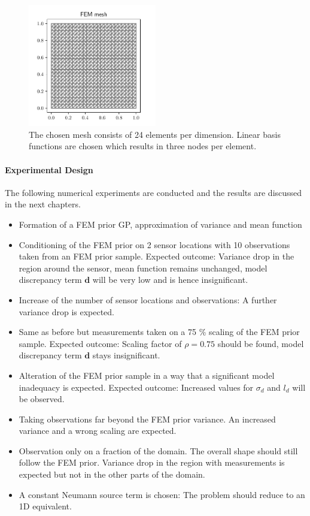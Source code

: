 \documentclass[%
  a4paper,oneside,%
  11pt,%
  smallchapters,
  style=printdev,
  extramargin,
  green,%
  rgb, <cmyk>
  ]{tubsbook}
\begin{document}
\begin{figure}[!ht]
\includegraphics[width=0.5\textwidth]{pics/mesh.pdf}
\centering
\caption[Mesh of the 2D example]{The chosen mesh consists of 24 elements per dimension. Linear basis functions are chosen which results in three nodes per element.}
\label{fig:meshFEM}
\end{figure}


\paragraph{Experimental Design}
The following numerical experiments are conducted and the results are discussed in the next chapters.

\begin{itemize}
  \item Formation of a FEM prior GP, approximation of variance and mean function
  \item Conditioning of the FEM prior on 2 sensor locations with 10 observations taken from an FEM prior sample. Expected outcome: Variance drop in the region around the sensor, mean function remains unchanged, model discrepancy term $\bm{d}$ will be very low and is hence insignificant.
  \item Increase of the number of sensor locations and observations: A further variance drop is expected.
  \item Same as before but measurements taken on a 75 \% scaling of the FEM prior sample. Expected outcome: Scaling factor of $\rho = 0.75$ should be found, model discrepancy term $\bm{d}$ stays insignificant.
  \item Alteration of the FEM prior sample in a way that a significant model inadequacy is expected. Expected outcome: Increased values for $\sigma_d$ and $l_d$ will be observed.
  \item Taking observations far beyond the FEM prior variance. An increased variance and a wrong scaling are expected.
  \item Observation only on a fraction of the domain. The overall shape should still follow the FEM prior. Variance drop in the region with measurements is expected but not in the other parts of the domain.
  \item A constant Neumann source term is chosen: The problem should reduce to an 1D equivalent.

\end{itemize}
\end{document}
